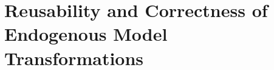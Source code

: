 \chapter{Reusability and Correctness of Endogenous Model Transformations}
\label{chap:reusable-correct-transformations}















 